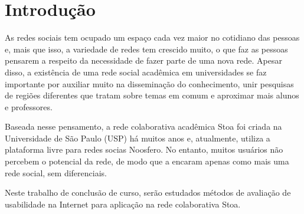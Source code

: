 \chapter{Introdução}
\label{cap:introducao}

    As redes sociais tem ocupado um espaço cada vez maior no cotidiano das pessoas e, mais que isso, a variedade de redes tem crescido muito, o que faz as pessoas pensarem a respeito da necessidade de fazer parte de uma nova rede. Apesar disso, a existência de uma rede social acadêmica em universidades se faz importante por auxiliar muito na disseminação do conhecimento, unir pesquisas de regiões diferentes que tratam sobre temas em comum e aproximar mais alunos e professores. 
    
    Baseada nesse pensamento, a rede colaborativa acadêmica Stoa foi criada na Universidade de São Paulo (USP) há muitos anos e, atualmente, utiliza a plataforma livre para redes socias Noosfero. No entanto, muitos usuários não percebem o potencial da rede, de modo que a encaram apenas como mais uma rede social, sem diferenciais.
    
    

    Neste trabalho de conclusão de curso, serão estudados métodos de avaliação de usabilidade na Internet para aplicação na rede colaborativa Stoa.



